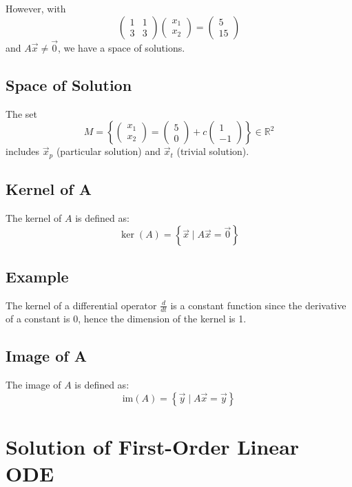 \documentclass[11pt]{article}
\begin{document}
However, with
\[ \begin{pmatrix}
    1 & 1 \\
    3 & 3
\end{pmatrix} \begin{pmatrix}
    x_1 \\
    x_2
\end{pmatrix} = \begin{pmatrix}
    5 \\
    15
\end{pmatrix} \]
and \( A\vec{x} \neq \vec{0} \), we have a space of solutions.

\subsection*{Space of Solution}
The set
\[ M = \left\{ \begin{pmatrix}
    x_1 \\
    x_2
\end{pmatrix} = \begin{pmatrix}
    5 \\
    0
\end{pmatrix} + c \begin{pmatrix}
    1 \\
    -1
\end{pmatrix} \right\} \in \mathbb{R}^2 \]
includes \( \vec{x}_p \) (particular solution) and \( \vec{x}_t \) (trivial solution).

\subsection*{Kernel of A}
The kernel of \( A \) is defined as:
\[ \ker(A) = \left\{ \vec{x} \mid A\vec{x} = \vec{0} \right\} \]

\subsection*{Example}
The kernel of a differential operator \( \frac{d}{dt} \) is a constant function since the derivative of a constant is 0, hence the dimension of the kernel is 1.

\subsection*{Image of A}
The image of \( A \) is defined as:
\[ \text{im}(A) = \left\{ \vec{y} \mid A\vec{x} = \vec{y} \right\} \]



\section*{Solution of First-Order Linear ODE}
\end{document}

